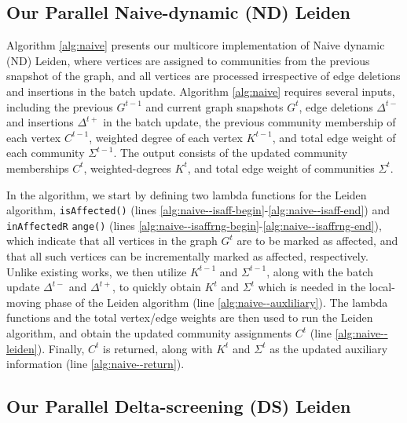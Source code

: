 \subsection{Our Parallel Naive-dynamic (ND) Leiden}
\label{sec:our-naive}

Algorithm \ref{alg:naive} presents our multicore implementation of Naive dynamic (ND) Leiden, where vertices are assigned to communities from the previous snapshot of the graph, and all vertices are processed irrespective of edge deletions and insertions in the batch update. Algorithm \ref{alg:naive} requires several inputs, including the previous $G^{t-1}$ and current graph snapshots $G^t$, edge deletions $\Delta^{t-}$ and insertions $\Delta^{t+}$ in the batch update, the previous community membership of each vertex $C^{t-1}$, weighted degree of each vertex $K^{t-1}$, and total edge weight of each community $\Sigma^{t-1}$. The output consists of the updated community memberships $C^t$, weighted-degrees $K^t$, and total edge weight of communities $\Sigma^t$.

In the algorithm, we start by defining two lambda functions for the Leiden algorithm, \texttt{isAffected()} (lines \ref{alg:naive--isaff-begin}-\ref{alg:naive--isaff-end}) and \texttt{inAffectedR} \texttt{ange()} (lines \ref{alg:naive--isaffrng-begin}-\ref{alg:naive--isaffrng-end}), which indicate that all vertices in the graph $G^t$ are to be marked as affected, and that all such vertices can be incrementally marked as affected, respectively. Unlike existing works, we then utilize $K^{t-1}$ and $\Sigma^{t-1}$, along with the batch update $\Delta^{t-}$ and $\Delta^{t+}$, to quickly obtain $K^t$ and $\Sigma^t$ which is needed in the local-moving phase of the Leiden algorithm (line \ref{alg:naive--auxliliary}). The lambda functions and the total vertex/edge weights are then used to run the Leiden algorithm, and obtain the updated community assignments $C^t$ (line \ref{alg:naive--leiden}). Finally, $C^t$ is returned, along with $K^t$ and $\Sigma^t$ as the updated auxiliary information (line \ref{alg:naive--return}).




\subsection{Our Parallel Delta-screening (DS) Leiden}
\label{sec:our-delta}


